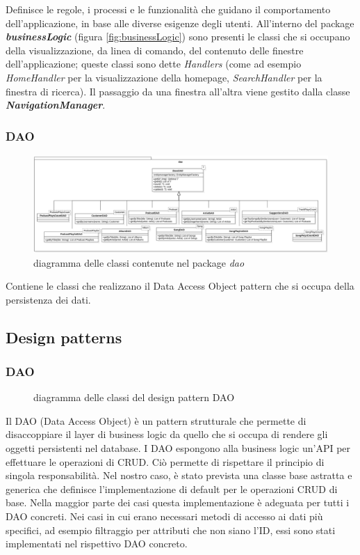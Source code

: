 \documentclass{article}
\begin{document}
  Definisce le regole, i processi e le funzionalità che guidano il comportamento dell’applicazione, in base alle diverse esigenze degli utenti. All'interno del package \textbf{\textit{businessLogic}} (figura \ref{fig:businessLogic}) sono presenti le classi che si occupano della visualizzazione, da linea di comando, del contenuto delle finestre dell'applicazione; queste classi sono dette \textit{Handlers} (come ad esempio \textit{HomeHandler} per la visualizzazione della homepage, \textit{SearchHandler} per la finestra di ricerca). Il passaggio da una finestra all'altra viene gestito dalla classe \textbf{\textit{NavigationManager}}.

  \subsubsection{DAO}
  \begin{figure}[H]
    \centering
    \includegraphics[width=1\linewidth]{DAOs.png}
    \caption{diagramma delle classi contenute nel package \textit{dao}}
    \label{fig:DAO}
  \end{figure}
  Contiene le classi che realizzano il Data Access Object pattern che si occupa della persistenza dei dati.

  \subsection{Design patterns}

  \subsubsection{DAO}
  \begin{figure}[H]
    \centering
    
    \caption{diagramma delle classi del design pattern DAO}
    \label{fig:daoPattern}
  \end{figure}
  Il DAO (Data Access Object) è un pattern strutturale che permette di disaccoppiare il layer di business logic da quello che si occupa di rendere gli oggetti persistenti nel database. I DAO espongono alla business logic un'API per effettuare le operazioni di CRUD. Ciò permette di rispettare il principio di singola responsabilità.
  Nel nostro caso, è stato prevista una classe base astratta e generica che definisce l'implementazione di default per le operazioni CRUD di base. Nella maggior parte dei casi questa implementazione è adeguata per tutti i DAO concreti. Nei casi in cui erano necessari metodi di accesso ai dati più specifici, ad esempio filtraggio per attributi che non siano l'ID, essi sono stati implementati nel rispettivo DAO concreto.
\end{document}
